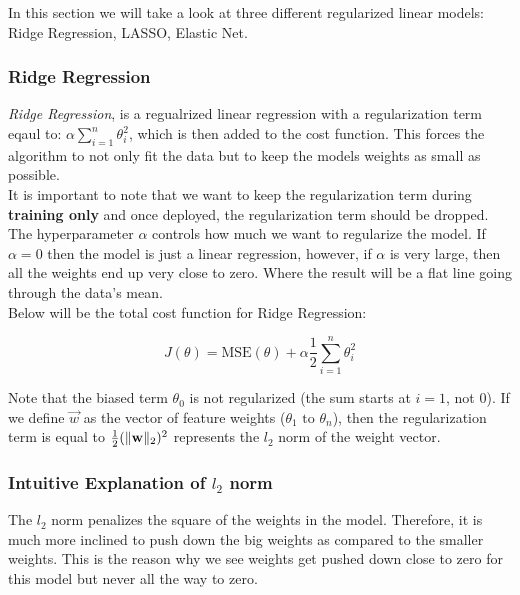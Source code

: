 \noindent 
In this section we will take a look at three different regularized linear models: 
Ridge Regression, LASSO, Elastic Net.

\subsubsection{Ridge Regression}

\textit{Ridge Regression}, is a regualrized linear regression with a regularization term
eqaul to:  $\alpha \sum_{i=1}^{n} \theta_{i}^{2}$, which is then added to the cost function.
This forces the algorithm to not only fit the data but to keep the models weights as small
as possible. \\

\noindent 
It is important to note that we want to keep the regularization term during
\textbf{training only} and once deployed, the regularization term should be dropped.\\

\noindent 
The hyperparameter $\alpha$ controls how much we want to regularize the model.
If $\alpha = 0$ then the model is just a linear regression, however, if $\alpha$ is very
large, then all the weights end up very close to zero. Where the result will be a flat line
going through the data's mean.\\

\noindent 
Below will be the total cost function for Ridge Regression:

$$J(\theta) = \text{MSE}(\theta) + \alpha \frac{1}{2} \sum_{i=1}^{n} \theta_{i}^{2}$$

\noindent 
Note that the biased term $\theta_{0}$ is not regularized (the sum starts at $i=1$, 
not 0). If we define $\vec{w}$ as the vector of feature weights 
($\theta_{1} \text{ to } \theta_{n}$), then the regularization term is equal to 
$\frac{1}{2}(\lVert\mathbf{w}\rVert_{2})^{2}$ represents the $l_{2}$ norm of the weight vector. \\ 

\subsubsection*{Intuitive Explanation of $l_{2}$ norm}
\noindent 
The $l_{2}$ norm penalizes the square of the weights in the model. Therefore, it is much
more inclined to push down the big weights as compared to the smaller weights. This is the reason why
we see weights get pushed down close to zero for this model but never all the way to zero. \\

